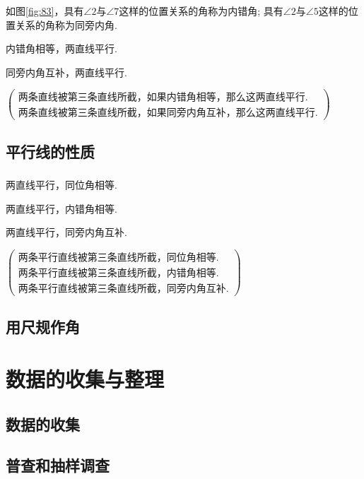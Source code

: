 \documentclass[fontset=windows]{ctexrep}
\begin{document}
\subsection{}
\par 如图\ref{fig:83}，具有$\angle 2$与$\angle 7$这样的位置关系的角称为{\heiti 内错角}; 具有$\angle 2$与$\angle 5$这样的位置关系的角称为{\heiti 同旁内角}.
\par {\heiti 内错角相等，两直线平行.\par 同旁内角互补，两直线平行.}
\par
$\begin{pmatrix}
    两条直线被第三条直线所截，如果内错角相等，那么这两直线平行.\\两条直线被第三条直线所截，如果同旁内角互补，那么这两直线平行.
\end{pmatrix}$
\section{平行线的性质}
\subsection{}
\par {\heiti 两直线平行，同位角相等.\par 两直线平行，内错角相等.\par 两直线平行，同旁内角互补.}
\par 
$\begin{pmatrix}
    两条平行直线被第三条直线所截，同位角相等.\\
    两条平行直线被第三条直线所截，内错角相等.\\
    两条平行直线被第三条直线所截，同旁内角互补.
\end{pmatrix}$
\subsection{}
\section{用尺规作角}
\chapter{数据的收集与整理}
\section{数据的收集}
\section{普查和抽样调查}
\end{document}
